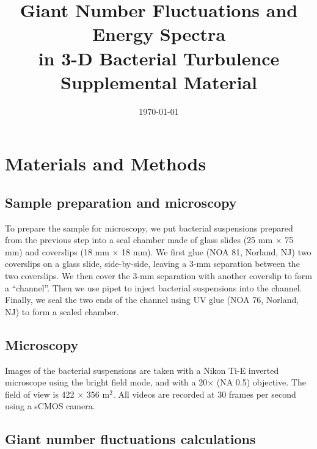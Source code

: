 \documentclass[preprint,aps,prl,amsmath,amssymb,longbibliography]{revtex4-2}
\date{\today}
\begin{document}
\title{Giant Number Fluctuations and Energy Spectra\\
        in 3-D Bacterial Turbulence\\
        Supplemental Material}
\maketitle



\section{Materials and Methods}
\label{sec:method}

\subsection{Sample preparation and microscopy}

To prepare the sample for microscopy, we put bacterial suspensions prepared from the previous step into a seal chamber made of glass slides (25 mm $\times$ 75 mm) and coverslips (18 mm $\times$ 18 mm). We first glue (NOA 81, Norland, NJ) two coverslips on a glass slide, side-by-side, leaving a 3-mm separation between the two coverslips. We then cover the 3-mm separation with another coverslip to form a ``channel''. Then we use pipet to inject bacterial suspensions into the channel. Finally, we seal the two ends of the channel using UV glue (NOA 76, Norland, NJ) to form a sealed chamber.

\subsection{Microscopy}

Images of the bacterial suspensions are taken with a Nikon Ti-E inverted microscope using the bright field mode, and with a 20$\times$ (NA 0.5) objective. The field of view is 422 $\times$ 356 \textmu m$^2$. All videos are recorded at 30 frames per second using a sCMOS camera.

\subsection{Giant number fluctuations calculations}
\end{document}
